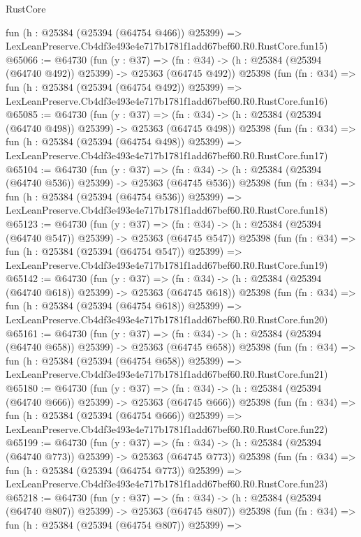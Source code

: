 \begin{lexlean}{RustCore}
\begin{coremodule}
    fun (h : @25384 (@25394 (@64754 @466)) @25399) =>
    LexLeanPreserve.Cb4df3e493e4e717b1781f1add67bef60.R0.RustCore.fun15)
@65066 := @64730
    (fun (y : @37) =>
    (fn : @34) -> (h : @25384 (@25394 (@64740 @492)) @25399) -> @25363 (@64745 @492))
    @25398
    (fun (fn : @34) =>
    fun (h : @25384 (@25394 (@64754 @492)) @25399) =>
    LexLeanPreserve.Cb4df3e493e4e717b1781f1add67bef60.R0.RustCore.fun16)
@65085 := @64730
    (fun (y : @37) =>
    (fn : @34) -> (h : @25384 (@25394 (@64740 @498)) @25399) -> @25363 (@64745 @498))
    @25398
    (fun (fn : @34) =>
    fun (h : @25384 (@25394 (@64754 @498)) @25399) =>
    LexLeanPreserve.Cb4df3e493e4e717b1781f1add67bef60.R0.RustCore.fun17)
@65104 := @64730
    (fun (y : @37) =>
    (fn : @34) -> (h : @25384 (@25394 (@64740 @536)) @25399) -> @25363 (@64745 @536))
    @25398
    (fun (fn : @34) =>
    fun (h : @25384 (@25394 (@64754 @536)) @25399) =>
    LexLeanPreserve.Cb4df3e493e4e717b1781f1add67bef60.R0.RustCore.fun18)
@65123 := @64730
    (fun (y : @37) =>
    (fn : @34) -> (h : @25384 (@25394 (@64740 @547)) @25399) -> @25363 (@64745 @547))
    @25398
    (fun (fn : @34) =>
    fun (h : @25384 (@25394 (@64754 @547)) @25399) =>
    LexLeanPreserve.Cb4df3e493e4e717b1781f1add67bef60.R0.RustCore.fun19)
@65142 := @64730
    (fun (y : @37) =>
    (fn : @34) -> (h : @25384 (@25394 (@64740 @618)) @25399) -> @25363 (@64745 @618))
    @25398
    (fun (fn : @34) =>
    fun (h : @25384 (@25394 (@64754 @618)) @25399) =>
    LexLeanPreserve.Cb4df3e493e4e717b1781f1add67bef60.R0.RustCore.fun20)
@65161 := @64730
    (fun (y : @37) =>
    (fn : @34) -> (h : @25384 (@25394 (@64740 @658)) @25399) -> @25363 (@64745 @658))
    @25398
    (fun (fn : @34) =>
    fun (h : @25384 (@25394 (@64754 @658)) @25399) =>
    LexLeanPreserve.Cb4df3e493e4e717b1781f1add67bef60.R0.RustCore.fun21)
@65180 := @64730
    (fun (y : @37) =>
    (fn : @34) -> (h : @25384 (@25394 (@64740 @666)) @25399) -> @25363 (@64745 @666))
    @25398
    (fun (fn : @34) =>
    fun (h : @25384 (@25394 (@64754 @666)) @25399) =>
    LexLeanPreserve.Cb4df3e493e4e717b1781f1add67bef60.R0.RustCore.fun22)
@65199 := @64730
    (fun (y : @37) =>
    (fn : @34) -> (h : @25384 (@25394 (@64740 @773)) @25399) -> @25363 (@64745 @773))
    @25398
    (fun (fn : @34) =>
    fun (h : @25384 (@25394 (@64754 @773)) @25399) =>
    LexLeanPreserve.Cb4df3e493e4e717b1781f1add67bef60.R0.RustCore.fun23)
@65218 := @64730
    (fun (y : @37) =>
    (fn : @34) -> (h : @25384 (@25394 (@64740 @807)) @25399) -> @25363 (@64745 @807))
    @25398
    (fun (fn : @34) =>
    fun (h : @25384 (@25394 (@64754 @807)) @25399) =>

\end{coremodule}
\end{lexlean}
